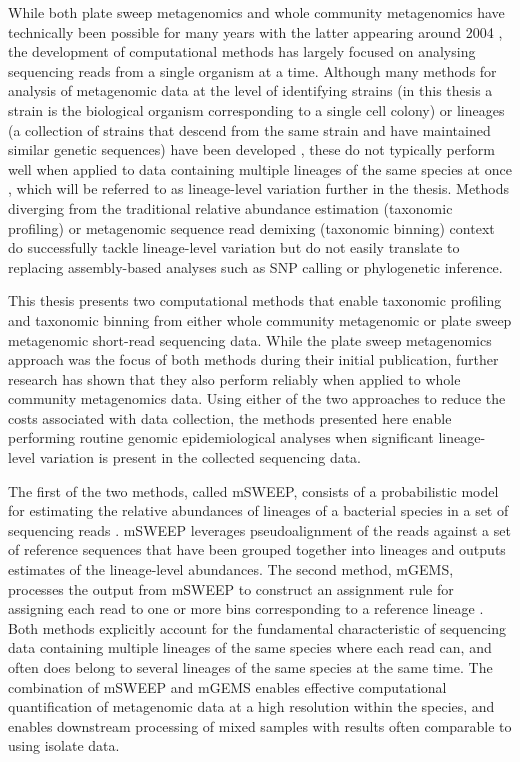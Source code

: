 \documentclass[officiallayout]{tktla}
\begin{document}
While both plate sweep metagenomics and whole community metagenomics have
technically been possible for many years with the latter appearing
around 2004 \citep{tyson2004community, venter2004environmental}, the
development of computational methods has largely focused on analysing
sequencing reads from a single organism at a time. Although many
methods for analysis of metagenomic data at the level of identifying
strains (in this thesis a strain is the biological organism
corresponding to a single cell colony) or lineages (a collection of
strains that descend from the same strain and have maintained similar
genetic sequences) have been developed \citep{breitwieser2019review},
these do not typically perform well when applied to data containing
multiple lineages of the same species at once
\citep{sczyrba2017critical}, which will be referred to as
lineage-level variation further in the thesis. Methods diverging from
the traditional relative abundance estimation (taxonomic profiling)
\citep{truong2017microbial} or metagenomic sequence read demixing
(taxonomic binning) \citep{van2022strainge} context do successfully
tackle lineage-level variation but do not easily translate to replacing
assembly-based analyses such as SNP calling or phylogenetic inference.

This thesis presents two computational methods that enable
taxonomic profiling and taxonomic binning from either whole community metagenomic
or plate sweep metagenomic short-read sequencing data. While the plate
sweep metagenomics approach was the focus of both methods during their
initial publication, further research has shown that they also perform reliably
when applied to whole community metagenomics data. Using either of the two
approaches to reduce the costs associated with data collection, the
methods presented here enable performing routine genomic
epidemiological analyses when significant lineage-level variation is
present in the collected sequencing data.

The first of the two methods, called mSWEEP, consists of a
probabilistic model for estimating the relative abundances of lineages
of a bacterial species in a set of sequencing reads
\citep{maklin_high-resolution_2021}. mSWEEP leverages pseudoalignment
\citep{bray2016near} of the reads against a set of reference sequences
that have been grouped together into lineages and outputs estimates of
the lineage-level abundances. The second method, mGEMS, processes the
output from mSWEEP to construct an assignment rule for assigning each
read to one or more bins corresponding to a reference lineage
\citep{maklin_bacterial_2021}. Both methods explicitly account for the
fundamental characteristic of sequencing data containing multiple lineages of the same species where
each read can, and often does belong to several lineages of the same
species at the same time. The combination of mSWEEP and mGEMS enables
effective computational quantification of metagenomic data at a high
resolution within the species, and enables downstream processing of
mixed samples with results often comparable to using isolate data.
\end{document}
